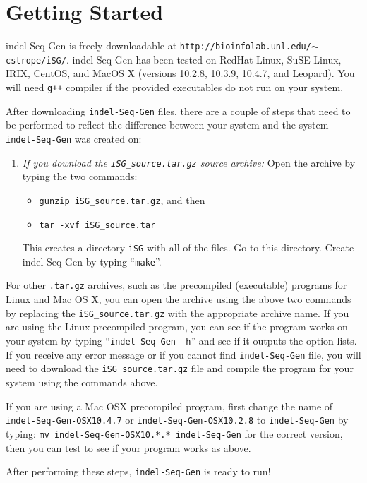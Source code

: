 \documentclass[10pt]{article}
\begin{document}
\section{Getting Started}

indel-Seq-Gen is freely downloadable at {\tt http://bioinfolab.unl.edu/$\sim$cstrope/iSG/}.
indel-Seq-Gen has been tested on RedHat Linux, SuSE Linux, IRIX, CentOS, and MacOS X (versions 10.2.8, 10.3.9, 10.4.7, and Leopard).  You will need {\tt g++} compiler if the provided executables do not run on your system.

After downloading {\tt indel-Seq-Gen} files, there are a couple of steps that need to be
performed to reflect the difference between your system and the system {\tt indel-Seq-Gen} was created on:

\begin{enumerate}

\item {\it If you download the {\tt iSG\_source.tar.gz} source archive:}  Open the archive by typing the two commands:
 \begin{itemize}
 \item[] {\tt gunzip iSG\_source.tar.gz}, and then
 \item[] {\tt tar -xvf iSG\_source.tar}
 \end{itemize}
This creates a directory {\tt iSG} with all of the files.  Go to this directory. Create
indel-Seq-Gen by typing ``{\tt make}''.
\end{enumerate}

For other {\tt .tar.gz} archives, such as the precompiled (executable) programs for Linux and Mac OS X, you can open the archive using the above two commands by replacing the {\tt iSG\_source.tar.gz} with the appropriate archive name.  If you are using the Linux precompiled program, you can see if the program works on your system by typing
``{\tt indel-Seq-Gen -h}'' and see if it outputs the option lists.  If you receive any error message or if you cannot find {\tt indel-Seq-Gen} file, you will need to download the {\tt iSG\_source.tar.gz} file and compile the program for your system using the commands above.

If you are using a Mac OSX precompiled program, first change the name of {\tt
indel-Seq-Gen-OSX10.4.7} or {\tt indel-Seq-Gen-OSX10.2.8} to {\tt indel-Seq-Gen} by typing:
\verb+mv indel-Seq-Gen-OSX10.*.* indel-Seq-Gen+ for the correct version, then you can test to see if your program works as above.

After performing these steps, {\tt indel-Seq-Gen} is ready to run!
\end{document}
